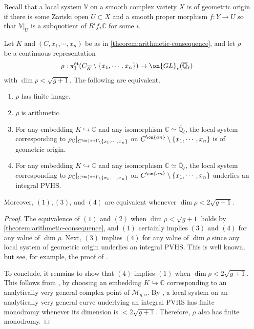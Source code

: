 Recall that a local system $\mathbb V$ on a smooth complex variety $X$ is of geometric origin if there is
some Zariski open $U \subset X$ and a smooth proper morphism $f: Y \to U$ so that
$\mathbb V|_U$ is a subquotient of $R^i f_* \mathbb C$ for some $i$.
\begin{corollary}
\notready
	\label{corollary:fontaine-mazur}
	Let $K$ and $(C, x_1, \cdots, x_n)$ be as in
	\autoref{theorem:arithmetic-consequence},
	and let
	$\rho$ be a continuous representation
\begin{align*}
\rho: \pi_1^{\text{\'et}}(C_{\overline{K}}\setminus\{x_1, \cdots, x_n\})\to \on{GL}_r(\overline{\mathbb{Q}}_\ell)
\end{align*}
with $\dim \rho < \sqrt{g+1}$. The following are equivalent.
	\begin{enumerate}
		\item $\rho$ has finite image.
		\item $\rho$ is arithmetic.
		\item For any embedding $K\hookrightarrow \mathbb{C}$ and any isomorphism $\mathbb{C}\simeq \overline{\mathbb{Q}}_\ell$, the local system corresponding to $\rho_\mathbb{C}|_{C^{\on{an}}\setminus\{x_1,
	\cdots, x_n\}}$ on $C^{\on{an}}\setminus\{x_1,
	\cdots, x_n\}$ is of geometric
			origin.
		\item For any embedding $K\hookrightarrow \mathbb{C}$ and any isomorphism $\mathbb{C}\simeq \overline{\mathbb{Q}}_\ell$, the local system corresponding to $\rho_\mathbb{C}|_{C^{\on{an}}\setminus\{x_1,
	\cdots, x_n\}}$ on $C^{\on{an}}\setminus\{x_1,
	\cdots, x_n\}$ underlies an
			integral PVHS.
	\end{enumerate}
	Moreover, $(1), (3)$, and $(4)$ are equivalent whenever $\dim \rho <
	2\sqrt{g+1}$.
\end{corollary}
\begin{proof}
The equivalence of $(1)$ and $(2)$ when $\dim \rho <\sqrt{g+1}$ holds by
	\autoref{theorem:arithmetic-consequence}, and $(1)$
	certainly implies $(3)$ and $(4)$ for any value of $\dim \rho$.
	Next, $(3)$ implies $(4)$ for any value of $\dim \rho$ since any local system of geometric origin
	underlies an integral PVHS. This is well known, but see, for example, the proof of
	\cite[Corollary 1.2.7]{LL:geometric-local-systems}.

	To conclude, it remains to show that $(4)$ implies $(1)$ when $\dim \rho
	< 2\sqrt{g+1}$.
	This follows from \cite[Corollary 1.2.7]{LL:geometric-local-systems},
	by choosing an embedding $K\hookrightarrow \mathbb{C}$ corresponding to an analytically very general complex point of $\mathscr{M}_{g,n}$.
	By \cite[Corollary 1.2.7]{LL:geometric-local-systems},
	 a local system on an analytically very general curve underlying an integral PVHS has finite monodromy whenever its dimension is
	$< 2\sqrt{g+1}$.
	Therefore, $\rho$ also has finite monodromy.
\end{proof}
